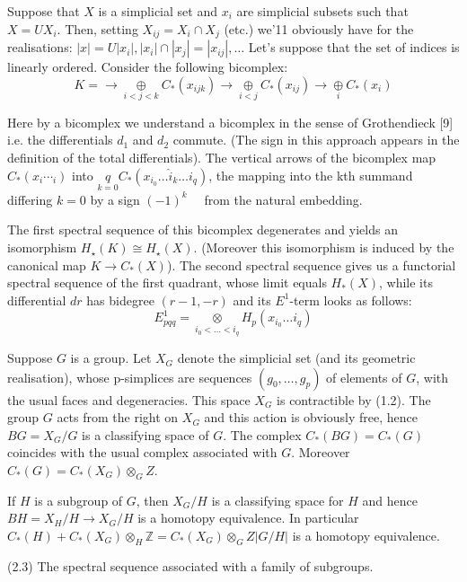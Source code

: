\documentclass{book}
\begin{document}
Suppose that $X$ is a simplicial set and $x_i$ are simplicial subsets such that $X=U X_i$. Then, setting $X_{i j}=X_i \cap X_j$ (etc.) we'11 obviously have for the realisations: $|x|=U\left|x_i\right|,\left|x_i\right| \cap\left|x_j\right|=\left|x_{i j}\right|, \ldots$ Let's suppose that the set of indices is linearly ordered. Consider the following bicomplex:
$$ K = \longrightarrow \underset{i<j<k}{\oplus} C_*\left(x_{i j k}\right) \longrightarrow \underset{i<j}{\oplus} C_*\left(x_{i j}\right)\longrightarrow \underset{i}{\oplus} C_*\left(x_{i}\right) $$


Here by a bicomplex we understand a bicomplex in the sense of Grothendieck [9] i.e. the differentials $d_1$ and $d_2$ commute. (The sign in this approach appears in the definition of the total differentials). The vertical arrows of the bicomplex map $C_*\left(x_i \cdots_i\right)$ into $\underset{k=0}{q} C_*\left(x_{i_0} \ldots \hat{i}_k \ldots i_q\right)$, the mapping into the kth summand differing $k=0$ by a sign $(-1)^k \quad$ from the natural embedding.

The first spectral sequence of this bicomplex degenerates and yields an isomorphism $H_{\star}(K) \cong H_{\star}(X)$. (Moreover this isomorphism is induced by the canonical map $K \rightarrow C_*(X)$). The second spectral sequence gives us a functorial spectral sequence of the first quadrant, whose limit equals $H_*(X)$, while its differential $d r$ has bidegree $(r-1,-r)$ and its $E^1$-term looks as follows: $$E_{p q q}^1=\underset{i_0<\ldots<i_q}{\otimes} H_p\left(x_{i_0} \ldots i_q\right)$$

Suppose $G$ is a group. Let $X_G$ denote the simplicial set (and its geometric realisation), whose p-simplices are sequences $\left(g_0, \ldots, g_p\right)$ of elements of $G$, with the usual faces and degeneracies. This space $X_G$ is contractible by (1.2). The group $G$ acts from the right on $X_G$ and this action is obviously free, hence $B G=X_G / G$ is a classifying space of $G$. The complex $C_*(B G)=C_*(G)$ coincides with the usual complex associated with $G$. Moreover $C_*(G)=C_*\left(X_G\right) \otimes_G Z$.

If $H$ is a subgroup of $G$, then $X_G / H$ is a classifying space for $H$ and hence $B H=X_H / H \rightarrow X_G / H$ is a homotopy equivalence. In particular $C_*(H)+C_*\left(X_G\right) \otimes_H \mathbb{Z}=C_*\left(X_G\right) \otimes_G Z|G / H|$ is a homotopy equivalence.

(2.3) The spectral sequence associated with a family of subgroups.
\end{document}
